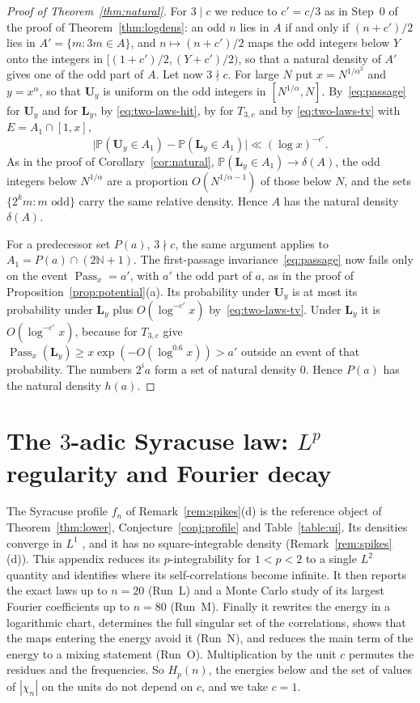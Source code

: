 \documentclass[12pt]{amsart}
\theoremstyle{definition}
\theoremstyle{remark}
\newcommand{\N}{\mathbb{N}}
\begin{document}
\begin{proof}[Proof of Theorem~\ref{thm:natural}]
For $3\mid c$ we reduce to $c'=c/3$ as in Step~0 of the proof of Theorem~\ref{thm:logdens}: an odd $n$ lies in $A$ if and only if $(n+c')/2$ lies in $A'=\{m:3m\in A\}$, and $n\mapsto(n+c')/2$ maps the odd integers below $Y$ onto the integers in $[(1+c')/2,(Y+c')/2)$, so that a natural density of $A'$ gives one of the odd part of $A$. Let now $3\nmid c$. For large $N$ put $x=N^{1/\alpha^2}$ and $y=x^\alpha$, so that $\mathbf U_y$ is uniform on the odd integers in $[N^{1/\alpha},N]$. By~\eqref{eq:passage} for $\mathbf U_y$ and for $\mathbf L_y$, by \eqref{eq:two-laws-hit}, by \cite[(1.20)]{Tao_2022} for $T_{3,c}$ and by \eqref{eq:two-laws-tv} with $E=A_1\cap[1,x]$,
\[
 \bigl|\mathbb P(\mathbf U_y\in A_1)-\mathbb P(\mathbf L_y\in A_1)\bigr|\ll(\log x)^{-c'}.
\]
As in the proof of Corollary~\ref{cor:natural}, $\mathbb P(\mathbf L_y\in A_1)\to\delta(A)$, the odd integers below $N^{1/\alpha}$ are a proportion $O(N^{1/\alpha-1})$ of those below $N$, and the sets $\{2^km:m\text{ odd}\}$ carry the same relative density. Hence $A$ has the natural density $\delta(A)$.

For a predecessor set $P(a)$, $3\nmid c$, the same argument applies to $A_1=P(a)\cap(2\N+1)$. The first-passage invariance~\eqref{eq:passage} now fails only on the event $\operatorname{Pass}_x=a'$, with $a'$ the odd part of $a$, as in the proof of Proposition~\ref{prop:potential}(a). Its probability under $\mathbf U_y$ is at most its probability under $\mathbf L_y$ plus $O(\log^{-c'}x)$ by~\eqref{eq:two-laws-tv}. Under $\mathbf L_y$ it is $O(\log^{-c'}x)$, because \cite[(5.12)--(5.15)]{Tao_2022} for $T_{3,c}$ give $\operatorname{Pass}_x(\mathbf L_y)\ge x\exp(-O(\log^{0.6}x))>a'$ outside an event of that probability. The numbers $2^ia$ form a set of natural density $0$. Hence $P(a)$ has the natural density $h(a)$.
\end{proof}


\section{The \texorpdfstring{$3$}{3}-adic Syracuse law: \texorpdfstring{$L^p$}{Lp} regularity and Fourier decay}
\label{sec:syracuse-lp}
The Syracuse profile $f_n$ of Remark~\ref{rem:spikes}(d) is the reference object of Theorem~\ref{thm:lower}, Conjecture~\ref{conj:profile} and Table~\ref{table:ui}. Its densities converge in $L^1$ \cite[(1.26)]{Tao_2022}, and it has no square-integrable density (Remark~\ref{rem:spikes}(d)). This appendix reduces its $p$-integrability for $1<p<2$ to a single $L^2$ quantity and identifies where its self-correlations become infinite. It then reports the exact laws up to $n=20$ (Run~L) and a Monte Carlo study of its largest Fourier coefficients up to $n=80$ (Run~M). Finally it rewrites the energy in a logarithmic chart, determines the full singular set of the correlations, shows that the maps entering the energy avoid it (Run~N), and reduces the main term of the energy to a mixing statement (Run~O). Multiplication by the unit $c$ permutes the residues and the frequencies. So $H_p(n)$, the energies below and the set of values of $|\chi_n|$ on the units do not depend on $c$, and we take $c=1$.
\end{document}
